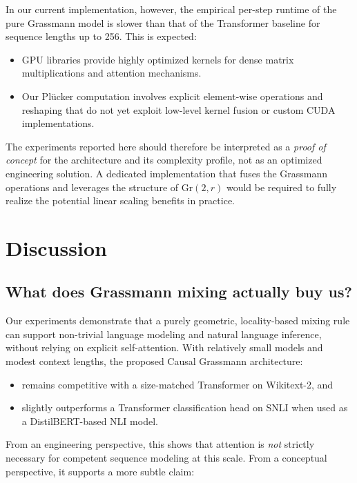 \documentclass[11pt]{article}
\newcommand{\Gr}{\mathrm{Gr}}
\begin{document}
In our current implementation, however, the empirical per-step runtime of the pure Grassmann model is slower than that of the Transformer baseline for sequence lengths up to 256. This is expected:

\begin{itemize}
    \item GPU libraries provide highly optimized kernels for dense matrix multiplications and attention mechanisms.
    \item Our Pl\"ucker computation involves explicit element-wise operations and reshaping that do not yet exploit low-level kernel fusion or custom CUDA implementations.
\end{itemize}

The experiments reported here should therefore be interpreted as a \emph{proof of concept} for the architecture and its complexity profile, not as an optimized engineering solution. A dedicated implementation that fuses the Grassmann operations and leverages the structure of $\Gr(2,r)$ would be required to fully realize the potential linear scaling benefits in practice.

\section{Discussion}

\subsection{What does Grassmann mixing actually buy us?}

Our experiments demonstrate that a purely geometric, locality-based mixing rule can support non-trivial language modeling and natural language inference, without relying on explicit self-attention. With relatively small models and modest context lengths, the proposed Causal Grassmann architecture:

\begin{itemize}
    \item remains competitive with a size-matched Transformer on Wikitext-2, and
    \item slightly outperforms a Transformer classification head on SNLI when used as a DistilBERT-based NLI model.
\end{itemize}

From an engineering perspective, this shows that attention is \emph{not} strictly necessary for competent sequence modeling at this scale. From a conceptual perspective, it supports a more subtle claim:
\end{document}

